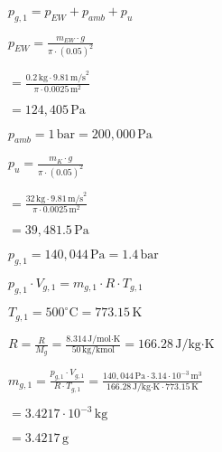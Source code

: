 \( p_{g,1} = p_{EW} + p_{amb} + p_{u} \)  

\( p_{EW} = \frac{m_{EW} \cdot g}{\pi \cdot (0.05)^2} \)  

\( = \frac{0.2 \, \text{kg} \cdot 9.81 \, \text{m/s}^2}{\pi \cdot 0.0025 \, \text{m}^2} \)  

\( = 124,405 \, \text{Pa} \)  

\( p_{amb} = 1 \, \text{bar} = 200,000 \, \text{Pa} \)  

\( p_{u} = \frac{m_K \cdot g}{\pi \cdot (0.05)^2} \)  

\( = \frac{32 \, \text{kg} \cdot 9.81 \, \text{m/s}^2}{\pi \cdot 0.0025 \, \text{m}^2} \)  

\( = 39,481.5 \, \text{Pa} \)  

\( p_{g,1} = 140,044 \, \text{Pa} = 1.4 \, \text{bar} \)  

\( p_{g,1} \cdot V_{g,1} = m_{g,1} \cdot R \cdot T_{g,1} \)  

\( T_{g,1} = 500^\circ \text{C} = 773.15 \, \text{K} \)  

\( R = \frac{R}{M_g} = \frac{8.314 \, \text{J/mol·K}}{50 \, \text{kg/kmol}} = 166.28 \, \text{J/kg·K} \)  

\( m_{g,1} = \frac{p_{g,1} \cdot V_{g,1}}{R \cdot T_{g,1}} = \frac{140,044 \, \text{Pa} \cdot 3.14 \cdot 10^{-3} \, \text{m}^3}{166.28 \, \text{J/kg·K} \cdot 773.15 \, \text{K}} \)  

\( = 3.4217 \cdot 10^{-3} \, \text{kg} \)  

\( = 3.4217 \, \text{g} \)
